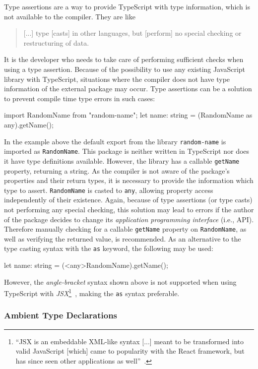 Type assertions are a way to provide TypeScript with type information, which is not available to the compiler. They are like
\begin{quote}
  [...] type [casts] in other languages, but [perform] no special checking or restructuring of data.~\cite{TypeScriptHandbook:BasicTypes}
\end{quote}
It is the developer who needs to take care of performing sufficient checks when using a type assertion. Because of the possibility to use any existing JavaScript library with TypeScript, situations where the compiler does not have type information of the external package may occur. Type assertions can be a solution to prevent compile time type errors in such cases:
\begin{JsCode}[numbers=none]
import RandomName from "random-name";
let name: string = (RandomName as any).getName();
\end{JsCode}
In the example above the default export from the library \texttt{random-name} is imported as \texttt{RandomName}. This package is neither written in TypeScript nor does it have type definitions available. However, the library has a callable \texttt{getName} property, returning a string. As the compiler is not aware of the package's properties and their return types, it is necessary to provide the information which type to assert. \texttt{RandomName} is casted to \texttt{any}, allowing property access independently of their existence. Again, because of type assertions (or type casts) not performing any special checking, this solution may lead to errors if the author of the package decides to change its \emph{application programming interface} (i.e., API). Therefore manually checking for a callable \texttt{getName} property on \texttt{RandomName}, as well as verifying the returned value, is recommended.
As an alternative to the type casting syntax with the \texttt{as} keyword, the following may be used:
\begin{JsCode}[numbers=none]
let name: string = (<any>RandomName).getName();
\end{JsCode}
However, the \emph{angle-bracket} syntax shown above is not supported when using TypeScript with \emph{JSX}\footnote{``JSX is an embeddable XML-like syntax [...] meant to be transformed into valid JavaScript [which] came to popularity with the React framework, but has since seen other applications as well''~\cite{TypeScriptHandbook:JSX}.}~\cite{TypeScriptHandbook:BasicTypes}, making the \texttt{as} syntax preferable.

\subsubsection{Ambient Type Declarations}


